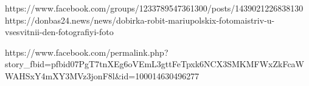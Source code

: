  
 
 
 
 

https://www.facebook.com/groups/1233789547361300/posts/1439021226838130
https://donbas24.news/news/dobirka-robit-mariupolskix-fotomaistriv-u-vsesvitnii-den-fotografiyi-foto


https://www.facebook.com/permalink.php?story_fbid=pfbid07PgT7tnXEg6oVEmL3gttFeTpxk6NCX3SMKMFWxZkFcaWWAHSxY4mXY3MVz3jonF8l&id=100014630496277
